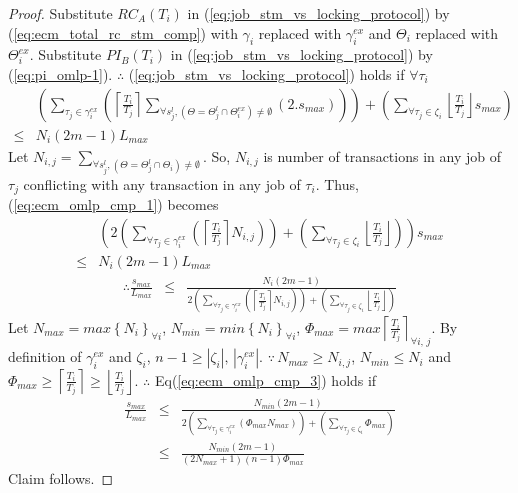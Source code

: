 \begin{proof}
%
Substitute $RC_{A}(T_{i})$ in (\ref{eq:job_stm_vs_locking_protocol})
by (\ref{eq:ecm_total_rc_stm_comp}) with $\gamma_i$ replaced with $\gamma_i^{ex}$ and $\Theta_i$ replaced with $\Theta_i^{ex}$. Substitute $PI_{B}(T_{i})$ in (\ref{eq:job_stm_vs_locking_protocol}) by (\ref{eq:pi_omlp-1}). $\therefore$ (\ref{eq:job_stm_vs_locking_protocol})
holds if $\forall \tau_i$
%
\begin{eqnarray}
 & \left(\sum_{\tau_{j}\in\gamma_{i}^{ex}}\left(\left\lceil\frac{T_{i}}{T_{j}}\right\rceil\sum_{\forall s_{j}^{l}, \left(\Theta=\Theta_j^l \cap \Theta_i^{ex} \right) \neq \emptyset}\left(2.s_{max}\right)\right)\right) +
\left( \sum_{\forall \tau_j \in \zeta_i} \left\lfloor \frac{T_i}{T_j}\right\rfloor s_{max} \right) \nonumber \\
\le & N_{i}\left(2m-1\right)L_{max}\label{eq:ecm_omlp_cmp_1}
\end{eqnarray}
%	
Let $N_{i,j}=\sum_{\forall s_{j}^{l}, \left(\Theta=\Theta_j^l \cap \Theta_i\right) \neq \emptyset}$. So, $N_{i,j}$ is number of transactions in any job of $\tau_{j}$ conflicting with any transaction in any job of $\tau_{i}$. Thus, (\ref{eq:ecm_omlp_cmp_1}) becomes 
%
\begin{eqnarray}
 & \left(2\left(\sum_{\forall\tau_{j}\in\gamma_{i}^{ex}}\left(\left\lceil \frac{T_{i}}{T_{j}}\right\rceil N_{i,j}\right)\right)+\left(\sum_{\forall\tau_{j}\in\zeta_{i}}\left\lfloor \frac{T_{i}}{T_{j}}\right\rfloor \right)\right)s_{max}\nonumber \\
\le & N_{i}\left(2m-1\right)L_{max}\label{eq:ecm_omlp_cmp_2}
\end{eqnarray}
%
\begin{eqnarray}
\therefore \frac{s_{max}}{L_{max}} & \le & \frac{N_{i}\left(2m-1\right)}{2\left(\sum_{\forall\tau_{j}\in\gamma_{i}^{ex}}\left(\left\lceil \frac{T_{i}}{T_{j}}\right\rceil N_{i,j}\right)\right)+\left(\sum_{\forall\tau_{j}\in\zeta_{i}}\left\lfloor \frac{T_{i}}{T_{j}}\right\rfloor \right)}\label{eq:ecm_omlp_cmp_3}
\end{eqnarray}
%
Let $N_{max}=max\left\{ N_{i}\right\}_{\forall i} $, $N_{min}=min\left\{ N_{i}\right\}_{\forall i} $,
$\Phi_{max}=max\left\lceil\frac{T_i}{T_j}\right\rceil_{\forall i,\,j}$. By definition of $\gamma_i^{ex}$ and $\zeta_i$, $n-1 \ge |\zeta_{i}|,\,|\gamma_{i}^{ex}|$.
$\because\, N_{max}\ge N_{i,j}$, $N_{min}\le N_{i}$ and $\Phi_{max}\ge\left\lceil \frac{T_{i}}{T_{j}}\right\rceil \ge\left\lfloor \frac{T_{i}}{T_{j}}\right\rfloor $.
$\therefore$ Eq(\ref{eq:ecm_omlp_cmp_3}) holds if 
%
\begin{eqnarray}
\frac{s_{max}}{L_{max}} & \le & \frac{N_{min}\left(2m-1\right)}{2\left(\sum_{\forall\tau_{j}\in\gamma_{i}^{ex}}\left(\Phi_{max}N_{max}\right)\right)+\left(\sum_{\forall\tau_{j}\in\zeta_{i}}\Phi_{max}\right)}\nonumber \\
 & \le & \frac{N_{min}\left(2m-1\right)}{\left(2N_{max}+1\right)(n-1)\Phi_{max}}\label{eq:ecm_omlp_cmp_4}
\end{eqnarray}
%
Claim follows.
%
\end{proof}
%
